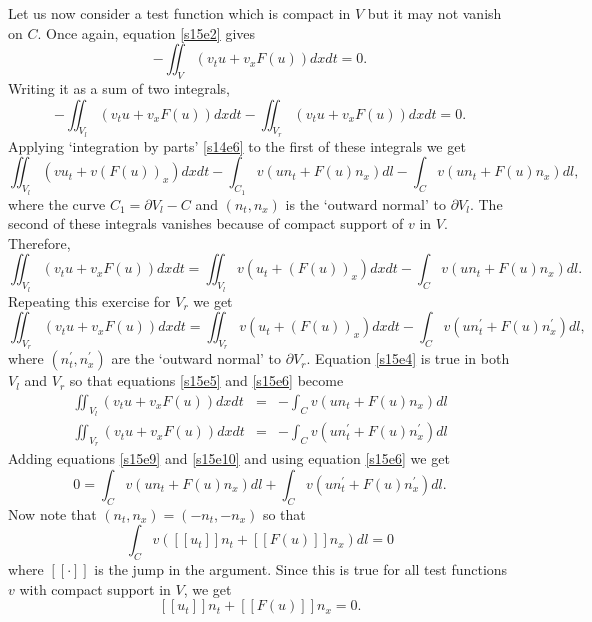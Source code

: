 \documentclass{article}
\theoremstyle{plain}
\numberwithin{thm}{section}
\theoremstyle{plain}
\numberwithin{prop}{section}
\theoremstyle{definition}
\numberwithin{defn}{section}
\theoremstyle{remark}
\numberwithin{equation}{section}
\begin{document}
Let us now consider a test function which is compact in $V$ but it may not vanish on $C$. Once again,
equation \eqref{s15e2} gives
\begin{equation}\label{s15e5}
-\iint_V \left(v_t u + v_x F(u)\right)dxdt = 0.
\end{equation}
Writing it as a sum of two integrals,
\begin{equation}\label{s15e6}
-\iint_{V_l} \left(v_t u + v_x F(u)\right)dxdt -\iint_{V_r} \left(v_t u + v_x F(u)\right)dxdt = 0.
\end{equation}
Applying `integration by parts' \eqref{s14e6} to the first of these integrals we get
\[
\iint_{V_l} \left(v u_t + v (F(u))_x\right)dxdt - \int_{C_1} v(un_t + F(u)n_x) dl - 
\int_C v(un_t + F(u)n_x) dl,
\]
where the curve $C_1 = \partial V_l - C$ and $(n_t, n_x)$ is the `outward normal' to $\partial V_l$. 
The second of these integrals vanishes because of compact support of $v$ in $V$. Therefore,
\begin{equation}\label{s15e7}
\iint_{V_l} \left(v_t u + v_x F(u)\right)dxdt = \iint_{V_l} v\left(u_t + (F(u))_x\right)dxdt
- \int_C v(un_t + F(u)n_x) dl.
\end{equation}
Repeating this exercise for $V_r$ we get
\begin{equation}\label{s15e8}
\iint_{V_r} \left(v_t u + v_x F(u)\right)dxdt = \iint_{V_r} v\left(u_t + (F(u))_x\right)dxdt
- \int_C v(un_t^\prime + F(u)n_x^\prime) dl,
\end{equation}
where $(n_t^\prime, n_x^\prime)$ are the `outward normal' to $\partial V_r$. Equation \eqref{s15e4}
is true in both $V_l$ and $V_r$ so that equations \eqref{s15e5} and \eqref{s15e6} become
\begin{eqnarray}
\iint_{V_l}\left(v_t u + v_x F(u)\right)dxdt&=&-\int_C v(un_t + F(u)n_x) dl \label{s15e9} \\
\iint_{V_r}\left(v_t u + v_x F(u)\right)dxdt&=&-\int_C v(un_t^\prime + F(u)n_x^\prime)dl 
\label{s15e10} 
\end{eqnarray}
Adding equations \eqref{s15e9} and \eqref{s15e10} and using equation \eqref{s15e6} we get
\[
0 = \int_C v(un_t + F(u)n_x) dl + \int_C v(un_t^\prime + F(u)n_x^\prime)dl.
\]
Now note that $(n_t, n_x) = (-n_t, -n_x)$ so that
\begin{equation}\label{s15e11}
\int_C v\left([[u_t]]n_t + [[F(u)]]n_x\right) dl = 0
\end{equation}
where $[[\cdot]]$ is the jump in the argument. Since this is true for all test functions $v$ with
compact support in $V$, we get
\begin{equation}\label{s15e12}
[[u_t]]n_t + [[F(u)]]n_x = 0.
\end{equation}
\end{document}
